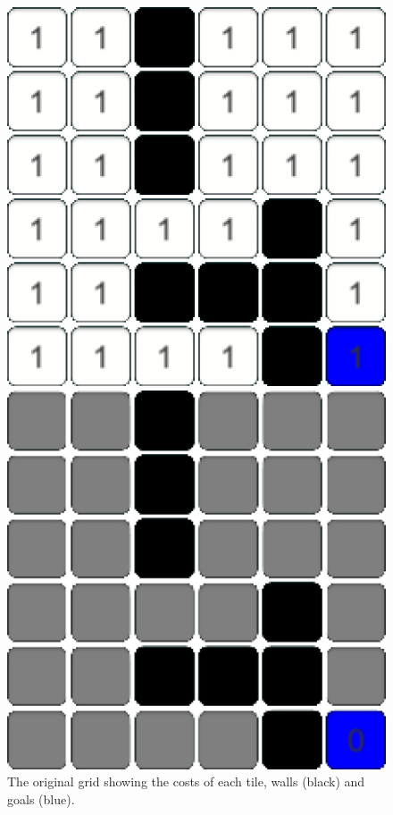 \documentclass[conference]{IEEEtran}
\begin{document}
\begin{figure}[h]
\centering
\begin{minipage}[t]{0.3\linewidth}
\centering
\includegraphics[width=1\textwidth]{images/intro/original.png}
\caption{The original grid showing the costs of each tile, walls (black) and goals (blue).}
\end{minipage}
\hfill
\begin{minipage}[t]{0.3\linewidth}
\centering
\includegraphics[width=1\textwidth]{images/intro/init.png}

\end{minipage}
\end{figure}
\end{document}
